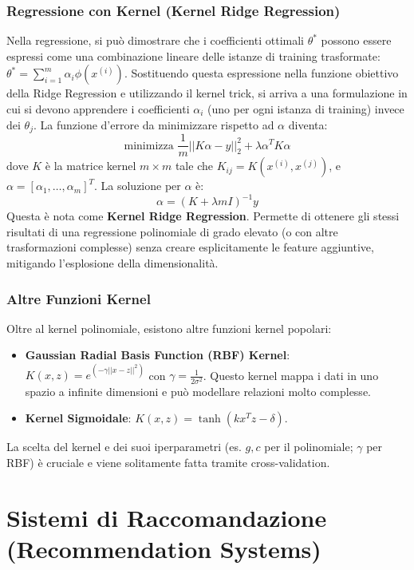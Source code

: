 \documentclass{article}
\begin{document}
\subsubsection{Regressione con Kernel (Kernel Ridge Regression)}
Nella regressione, si può dimostrare che i coefficienti ottimali $\theta^*$ possono essere espressi come una combinazione lineare delle istanze di training trasformate: $\theta^* = \sum_{i=1}^{m} \alpha_i \phi(x^{(i)})$. Sostituendo questa espressione nella funzione obiettivo della Ridge Regression e utilizzando il kernel trick, si arriva a una formulazione in cui si devono apprendere i coefficienti $\alpha_i$ (uno per ogni istanza di training) invece dei $\theta_j$.
La funzione d'errore da minimizzare rispetto ad $\alpha$ diventa:
$$ \text{minimizza } \frac{1}{m} ||K\alpha - y||_2^2 + \lambda \alpha^T K \alpha $$
dove $K$ è la matrice kernel $m \times m$ tale che $K_{ij} = K(x^{(i)}, x^{(j)})$, e $\alpha = [\alpha_1, \dots, \alpha_m]^T$.
La soluzione per $\alpha$ è:
$$ \alpha = (K + \lambda m I)^{-1} y $$
Questa è nota come \textbf{Kernel Ridge Regression}. Permette di ottenere gli stessi risultati di una regressione polinomiale di grado elevato (o con altre trasformazioni complesse) senza creare esplicitamente le feature aggiuntive, mitigando l'esplosione della dimensionalità.

\subsubsection{Altre Funzioni Kernel}
Oltre al kernel polinomiale, esistono altre funzioni kernel popolari:
\begin{itemize}
    \item \textbf{Gaussian Radial Basis Function (RBF) Kernel}: $K(x, z) = e^{\left(-\gamma ||x-z||^2\right)}$ con $\gamma = \frac{1}{2\sigma^2}$. Questo kernel mappa i dati in uno spazio a infinite dimensioni e può modellare relazioni molto complesse.
    \item \textbf{Kernel Sigmoidale}: $K(x, z) = \tanh(k x^T z - \delta)$.
\end{itemize}
La scelta del kernel e dei suoi iperparametri (es. $g, c$ per il polinomiale; $\gamma$ per RBF) è cruciale e viene solitamente fatta tramite cross-validation.




\section{Sistemi di Raccomandazione (Recommendation Systems)}
\end{document}
